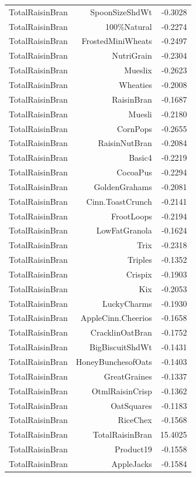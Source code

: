\begin{longtable}{@{}lrr@{}}
TotalRaisinBran & SpoonSizeShdWt & -0.3028 \\
TotalRaisinBran & 100\%Natural & -0.2274 \\
TotalRaisinBran & FrostedMiniWheats & -0.2497 \\
TotalRaisinBran & NutriGrain & -0.2304 \\
TotalRaisinBran & Mueslix & -0.2623 \\
TotalRaisinBran & Wheaties & -0.2008 \\
TotalRaisinBran & RaisinBran & -0.1687 \\
TotalRaisinBran & Muesli & -0.2180 \\
TotalRaisinBran & CornPops & -0.2655 \\
TotalRaisinBran & RaisinNutBran & -0.2084 \\
TotalRaisinBran & Basic4 & -0.2219 \\
TotalRaisinBran & CocoaPus & -0.2294 \\
TotalRaisinBran & GoldenGrahams & -0.2081 \\
TotalRaisinBran & Cinn.ToastCrunch & -0.2141 \\
TotalRaisinBran & FrootLoops & -0.2194 \\
TotalRaisinBran & LowFatGranola & -0.1624 \\
TotalRaisinBran & Trix & -0.2318 \\
TotalRaisinBran & Triples & -0.1352 \\
TotalRaisinBran & Crispix & -0.1903 \\
TotalRaisinBran & Kix & -0.2053 \\
TotalRaisinBran & LuckyCharms & -0.1930 \\
TotalRaisinBran & AppleCinn.Cheerios & -0.1658 \\
TotalRaisinBran & CracklinOatBran & -0.1752 \\
TotalRaisinBran & BigBiscuitShdWt & -0.1431 \\
TotalRaisinBran & HoneyBunchesofOats & -0.1403 \\
TotalRaisinBran & GreatGraines & -0.1337 \\
TotalRaisinBran & OtmlRaisinCrisp & -0.1362 \\
TotalRaisinBran & OatSquares & -0.1183 \\
TotalRaisinBran & RiceChex & -0.1568 \\
TotalRaisinBran & TotalRaisinBran & 15.4025 \\
TotalRaisinBran & Product19 & -0.1558 \\
TotalRaisinBran & AppleJacks & -0.1584 \\

\end{longtable}
